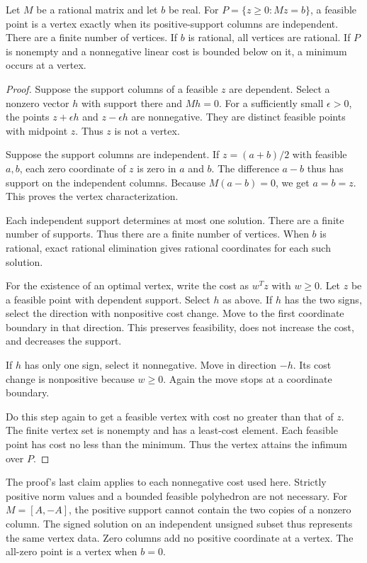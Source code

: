 \begin{lemma}\label{lem:vertices}
Let $M$ be a rational matrix and let $b$ be real.
For $P=\{z\ge0:Mz=b\}$, a feasible point is a vertex exactly when its positive-support columns are independent.
There are a finite number of vertices.
If $b$ is rational, all vertices are rational.
If $P$ is nonempty and a nonnegative linear cost is bounded below on it, a minimum occurs at a vertex.
\end{lemma}
\begin{proof}
Suppose the support columns of a feasible $z$ are dependent.
Select a nonzero vector $h$ with support there and $Mh=0$.
For a sufficiently small $\epsilon>0$, the points $z+\epsilon h$ and $z-\epsilon h$ are nonnegative.
They are distinct feasible points with midpoint $z$.
Thus $z$ is not a vertex.

Suppose the support columns are independent.
If $z=(a+b)/2$ with feasible $a,b$, each zero coordinate of $z$ is zero in $a$ and $b$.
The difference $a-b$ thus has support on the independent columns.
Because $M(a-b)=0$, we get $a=b=z$.
This proves the vertex characterization.

Each independent support determines at most one solution.
There are a finite number of supports.
Thus there are a finite number of vertices.
When $b$ is rational, exact rational elimination gives rational coordinates for each such solution.

For the existence of an optimal vertex, write the cost as $w^Tz$ with $w\ge0$.
Let $z$ be a feasible point with dependent support.
Select $h$ as above.
If $h$ has the two signs, select the direction with nonpositive cost change.
Move to the first coordinate boundary in that direction.
This preserves feasibility, does not increase the cost, and decreases the support.

If $h$ has only one sign, select it nonnegative.
Move in direction $-h$.
Its cost change is nonpositive because $w\ge0$.
Again the move stops at a coordinate boundary.

Do this step again to get a feasible vertex with cost no greater than that of $z$.
The finite vertex set is nonempty and has a least-cost element.
Each feasible point has cost no less than the minimum.
Thus the vertex attains the infimum over $P$.
\end{proof}

The proof's last claim applies to each nonnegative cost used here.
Strictly positive norm values and a bounded feasible polyhedron are not necessary.
For $M=[A,-A]$, the positive support cannot contain the two copies of a nonzero column.
The signed solution on an independent unsigned subset thus represents the same vertex data.
Zero columns add no positive coordinate at a vertex.
The all-zero point is a vertex when $b=0$.

